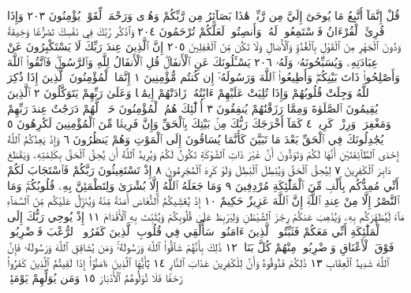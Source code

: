 قُلْ إِنَّمَآ أَتَّبِعُ مَا يُوحَىٰٓ إِلَيَّ مِن رَّبِّيۚ هَٰذَا بَصَآئِرُ مِن رَّبِّكُمْ
وَهُدࣰى وَرَحْمَةࣱ لِّقَوْمࣲ يُؤْمِنُونَ ٢٠٣ وَإِذَا قُرِئَ ٱلْقُرْءَانُ
فَٱسْتَمِعُوا۟ لَهُۥ وَأَنصِتُوا۟ لَعَلَّكُمْ تُرْحَمُونَ ٢٠٤ وَٱذْكُر رَّبَّكَ
فِي نَفْسِكَ تَضَرُّعࣰا وَخِيفَةࣰ وَدُونَ ٱلْجَهْرِ مِنَ ٱلْقَوْلِ بِٱلْغُدُوِّ
وَٱلْأٓصَالِ وَلَا تَكُن مِّنَ ٱلْغَٰفِلِينَ ٢٠٥ إِنَّ ٱلَّذِينَ عِندَ رَبِّكَ
لَا يَسْتَكْبِرُونَ عَنْ عِبَادَتِهِۦ وَيُسَبِّحُونَهُۥ وَلَهُۥ  ٢٠٦
يَسْـَٔلُونَكَ عَنِ ٱلْأَنفَالِۖ قُلِ ٱلْأَنفَالُ لِلَّهِ وَٱلرَّسُولِۖ فَٱتَّقُوا۟ ٱللَّهَ
وَأَصْلِحُوا۟ ذَاتَ بَيْنِكُمْۖ وَأَطِيعُوا۟ ٱللَّهَ وَرَسُولَهُۥٓ إِن كُنتُم
مُّؤْمِنِينَ ١ إِنَّمَا ٱلْمُؤْمِنُونَ ٱلَّذِينَ إِذَا ذُكِرَ ٱللَّهُ وَجِلَتْ
قُلُوبُهُمْ وَإِذَا تُلِيَتْ عَلَيْهِمْ ءَايَٰتُهُۥ زَادَتْهُمْ إِيمَٰنࣰا وَعَلَىٰ رَبِّهِمْ
يَتَوَكَّلُونَ ٢ ٱلَّذِينَ يُقِيمُونَ ٱلصَّلَوٰةَ وَمِمَّا رَزَقْنَٰهُمْ
يُنفِقُونَ ٣ أُو۟لَٰٓئِكَ هُمُ ٱلْمُؤْمِنُونَ حَقࣰّاۚ لَّهُمْ دَرَجَٰتٌ عِندَ
رَبِّهِمْ وَمَغْفِرَةࣱ وَرِزْقࣱ كَرِيمࣱ ٤ كَمَآ أَخْرَجَكَ رَبُّكَ
مِنۢ بَيْتِكَ بِٱلْحَقِّ وَإِنَّ فَرِيقࣰا مِّنَ ٱلْمُؤْمِنِينَ لَكَٰرِهُونَ ٥
يُجَٰدِلُونَكَ فِي ٱلْحَقِّ بَعْدَ مَا تَبَيَّنَ كَأَنَّمَا يُسَاقُونَ إِلَى ٱلْمَوْتِ
وَهُمْ يَنظُرُونَ ٦ وَإِذْ يَعِدُكُمُ ٱللَّهُ إِحْدَى ٱلطَّآئِفَتَيْنِ أَنَّهَا
لَكُمْ وَتَوَدُّونَ أَنَّ غَيْرَ ذَاتِ ٱلشَّوْكَةِ تَكُونُ لَكُمْ وَيُرِيدُ
ٱللَّهُ أَن يُحِقَّ ٱلْحَقَّ بِكَلِمَٰتِهِۦ وَيَقْطَعَ دَابِرَ ٱلْكَٰفِرِينَ ٧
لِيُحِقَّ ٱلْحَقَّ وَيُبْطِلَ ٱلْبَٰطِلَ وَلَوْ كَرِهَ ٱلْمُجْرِمُونَ ٨
إِذْ تَسْتَغِيثُونَ رَبَّكُمْ فَٱسْتَجَابَ لَكُمْ أَنِّي مُمِدُّكُم بِأَلْفࣲ
مِّنَ ٱلْمَلَٰٓئِكَةِ مُرْدِفِينَ ٩ وَمَا جَعَلَهُ ٱللَّهُ إِلَّا بُشْرَىٰ
وَلِتَطْمَئِنَّ بِهِۦ قُلُوبُكُمْۚ وَمَا ٱلنَّصْرُ إِلَّا مِنْ عِندِ ٱللَّهِۚ إِنَّ ٱللَّهَ
عَزِيزٌ حَكِيمٌ ١٠ إِذْ يُغَشِّيكُمُ ٱلنُّعَاسَ أَمَنَةࣰ مِّنْهُ وَيُنَزِّلُ
عَلَيْكُم مِّنَ ٱلسَّمَآءِ مَآءࣰ لِّيُطَهِّرَكُم بِهِۦ وَيُذْهِبَ عَنكُمْ
رِجْزَ ٱلشَّيْطَٰنِ وَلِيَرْبِطَ عَلَىٰ قُلُوبِكُمْ وَيُثَبِّتَ بِهِ ٱلْأَقْدَامَ ١١
إِذْ يُوحِي رَبُّكَ إِلَى ٱلْمَلَٰٓئِكَةِ أَنِّي مَعَكُمْ فَثَبِّتُوا۟ ٱلَّذِينَ
ءَامَنُوا۟ۚ سَأُلْقِي فِي قُلُوبِ ٱلَّذِينَ كَفَرُوا۟ ٱلرُّعْبَ فَٱضْرِبُوا۟
فَوْقَ ٱلْأَعْنَاقِ وَٱضْرِبُوا۟ مِنْهُمْ كُلَّ بَنَانࣲ ١٢ ذَٰلِكَ بِأَنَّهُمْ
شَآقُّوا۟ ٱللَّهَ وَرَسُولَهُۥۚ وَمَن يُشَاقِقِ ٱللَّهَ وَرَسُولَهُۥ فَإِنَّ ٱللَّهَ
شَدِيدُ ٱلْعِقَابِ ١٣ ذَٰلِكُمْ فَذُوقُوهُ وَأَنَّ لِلْكَٰفِرِينَ
عَذَابَ ٱلنَّارِ ١٤ يَٰٓأَيُّهَا ٱلَّذِينَ ءَامَنُوٓا۟ إِذَا لَقِيتُمُ ٱلَّذِينَ
كَفَرُوا۟ زَحْفࣰا فَلَا تُوَلُّوهُمُ ٱلْأَدْبَارَ ١٥ وَمَن يُوَلِّهِمْ يَوْمَئِذࣲ
